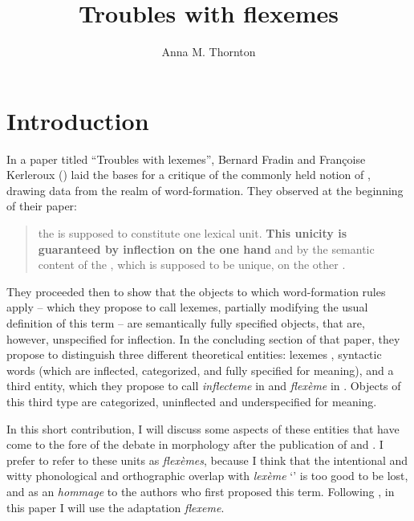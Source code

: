 \documentclass[output=paper]{langsci/langscibook}
\title{Troubles with flexemes}
\author{Anna M. Thornton\affiliation{University of L'Aquila}}
\begin{document}



\section{Introduction}\label{introduction}

In a paper titled ``Troubles with lexemes'', Bernard Fradin and
Françoise Kerle\-roux %
(\citeyear{Fradin03b}) %
%
laid the bases for a critique of the commonly
held notion of , drawing data from the realm of word-formation.
They observed at the beginning of their paper:

\begin{quote}
the  is supposed to constitute one lexical unit. \textbf{This
unicity is guaranteed by inflection on the one hand} and by the semantic
content of the , which is supposed to be unique, on the other
%
\citep[177, emphasis mine]{Fradin03b}%
%
.
\end{quote}

They proceeded then to show that the objects to which word-formation
rules apply -- which they propose to call lexemes, partially modifying
the usual definition of this term -- are semantically fully specified
objects, that are, however, unspecified for inflection. In the
concluding section of that paper, they propose to distinguish three
different theoretical entities: lexemes %
\citep[``lexical individuals defined by the conjunction of three properties: category, underspecification for inflection, full specification for meaning'', ][193]{Fradin03b}%
%
, syntactic words (which are inflected, categorized, and fully
specified for meaning), and a third entity, which they propose to call
\emph{inflecteme} in  and \emph{flexème} in  %
\citep[see also ][259]{Fradin2003}%
%
. Objects of this third type are categorized,
uninflected and underspecified for meaning.

In this short contribution, I will discuss some aspects of these
entities that have come to the fore of the debate in morphology after
the publication of %
\citet{Fradin03b} %
%
and %
\citet{Fradin2003}%
%
. I
prefer to refer to these units as \emph{flexèmes}, because I think that
the intentional and witty phonological and orthographic overlap with
\emph{lexème} `' is too good to be lost, and as an \emph{hommage}
to the authors who first proposed this term. Following %
\citet{Fradin17}%
, in this paper I will use the  adaptation \emph{flexeme}.
\end{document}
